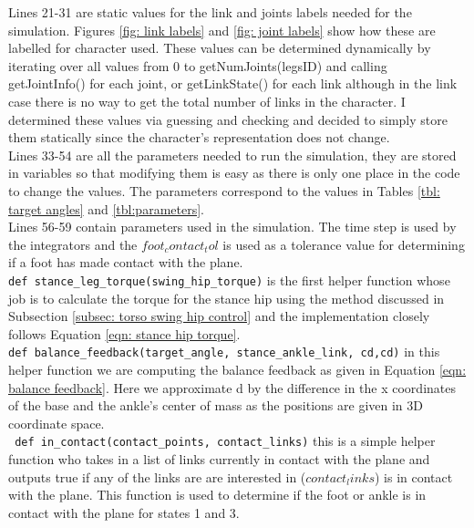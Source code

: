 \documentclass[12pt, a4paper]{article}
\begin{document}
Lines 21-31 are static values for the link and joints labels needed for the simulation. Figures \ref{fig: link labels} and \ref{fig: joint labels} show how these are labelled for character used. These values can be determined dynamically by iterating over all values from 0 to getNumJoints(legsID) and calling getJointInfo() for each joint, or getLinkState() for each link although in the link case there is no way to get the total number of links in the character. I determined these values via guessing and checking and decided to simply store them statically since the character's representation does not change. \\

Lines 33-54 are all the parameters needed to run the simulation, they are stored in variables so that modifying them is easy as there is only one place in the code to change the values. The parameters correspond to the values in Tables \ref{tbl: target angles} and \ref{tbl:parameters}.\\

Lines 56-59 contain parameters used in the simulation. The time step is used by the integrators and the $foot_contact_tol$ is used as a tolerance value for determining if a foot has made contact with the plane.\\

\verb;def stance_leg_torque(swing_hip_torque); is the first helper function whose job is to calculate the torque for the stance hip using the method discussed in Subsection \ref{subsec: torso swing hip control} and the implementation closely follows Equation \ref{eqn: stance hip torque}. \\

\verb;def balance_feedback(target_angle, stance_ankle_link, cd,cd); in this helper function we are computing the balance feedback as given in Equation \ref{eqn: balance feedback}. Here we approximate d by the difference in the x coordinates of the base and the ankle's center of mass as the positions are given in 3D coordinate space. \\

\verb; def in_contact(contact_points, contact_links); this is a simple helper function who takes in a list of links currently in contact with the plane and outputs true if any of the links are are interested in ($contact_links$) is in contact with the plane. This function is used to determine if the foot or ankle is in contact with the plane for states 1 and 3.\\
\end{document}

